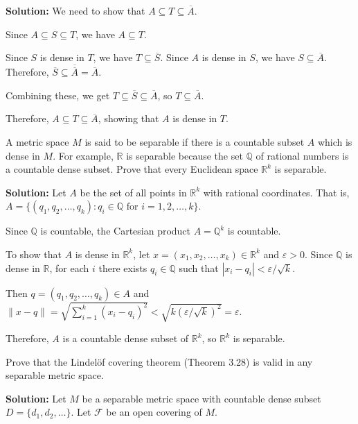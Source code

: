 \textbf{Solution:} We need to show that $A \subseteq T \subseteq \overline{A}$.

Since $A \subseteq S \subseteq T$, we have $A \subseteq T$.

Since $S$ is dense in $T$, we have $T \subseteq \overline{S}$. Since $A$ is dense in $S$, we have $S \subseteq \overline{A}$. Therefore, $\overline{S} \subseteq \overline{\overline{A}} = \overline{A}$.

Combining these, we get $T \subseteq \overline{S} \subseteq \overline{A}$, so $T \subseteq \overline{A}$.

Therefore, $A \subseteq T \subseteq \overline{A}$, showing that $A$ is dense in $T$.

\begin{problembox}
A metric space \( M \) is said to be separable if there is a countable subset \( A \) which is dense in \( M \). For example, \( \mathbb{R} \) is separable because the set \( \mathbb{Q} \) of rational numbers is a countable dense subset. Prove that every Euclidean space \( \mathbb{R}^k \) is separable.
\end{problembox}

\textbf{Solution:} Let $A$ be the set of all points in $\mathbb{R}^k$ with rational coordinates. That is, $A = \{(q_1, q_2, \ldots, q_k) : q_i \in \mathbb{Q} \text{ for } i = 1,2,\ldots,k\}$.

Since $\mathbb{Q}$ is countable, the Cartesian product $A = \mathbb{Q}^k$ is countable.

To show that $A$ is dense in $\mathbb{R}^k$, let $x = (x_1, x_2, \ldots, x_k) \in \mathbb{R}^k$ and $\varepsilon > 0$. Since $\mathbb{Q}$ is dense in $\mathbb{R}$, for each $i$ there exists $q_i \in \mathbb{Q}$ such that $|x_i - q_i| < \varepsilon/\sqrt{k}$.

Then $q = (q_1, q_2, \ldots, q_k) \in A$ and $\|x - q\| = \sqrt{\sum_{i=1}^k (x_i - q_i)^2} < \sqrt{k(\varepsilon/\sqrt{k})^2} = \varepsilon$.

Therefore, $A$ is a countable dense subset of $\mathbb{R}^k$, so $\mathbb{R}^k$ is separable.

\begin{problembox}
Prove that the Lindelöf covering theorem (Theorem 3.28) is valid in any separable metric space.
\end{problembox}

\textbf{Solution:} Let $M$ be a separable metric space with countable dense subset $D = \{d_1, d_2, \ldots\}$. Let $\mathcal{F}$ be an open covering of $M$.

